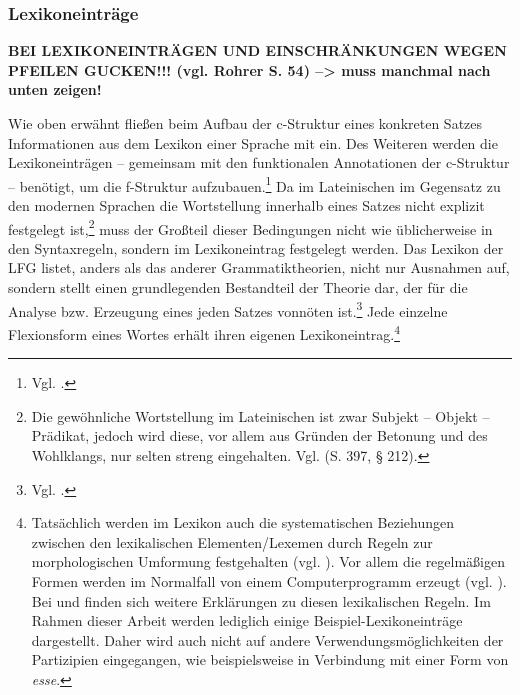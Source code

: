 \documentclass[12pt,a4paper]{article}
\begin{document}
\subsubsection{Lexikoneinträge}

\textbf{BEI LEXIKONEINTRÄGEN UND EINSCHRÄNKUNGEN WEGEN PFEILEN GUCKEN!!! (vgl. Rohrer S. 54) --> muss manchmal nach unten zeigen!}

Wie oben erwähnt fließen beim Aufbau der c-Struktur eines konkreten Satzes Informationen aus dem Lexikon einer Sprache mit ein. Des Weiteren werden die Lexikoneinträgen -- gemeinsam mit den funktionalen Annotationen der c-Struktur  -- benötigt, um die f-Struktur aufzubauen.\footnote{Vgl. \cite[63]{Skript}.} Da im Lateinischen im Gegensatz zu den modernen Sprachen die Wortstellung innerhalb eines Satzes nicht explizit festgelegt ist,\footnote{Die gewöhnliche Wortstellung im Lateinischen ist zwar Subjekt – Objekt – Prädikat, jedoch wird diese, vor allem aus Gründen der Betonung und des Wohlklangs, nur selten streng eingehalten. Vgl. \cite[397 §212]{LHS} (S. 397, § 212).} muss der Großteil dieser Bedingungen nicht wie üblicherweise in den Syntaxregeln, sondern im Lexikoneintrag festgelegt werden. Das Lexikon der LFG listet, anders als das anderer Grammatiktheorien, nicht nur Ausnahmen auf, sondern stellt einen grundlegenden Bestandteil der Theorie dar, der für die Analyse bzw. Erzeugung eines jeden Satzes vonnöten ist.\footnote{Vgl. \cite[3]{Dal}.} Jede einzelne Flexionsform eines Wortes erhält ihren eigenen Lexikoneintrag.\footnote{Tatsächlich werden im Lexikon auch die systematischen Beziehungen zwischen den lexikalischen Elementen/Lexemen durch Regeln zur morphologischen Umformung festgehalten (vgl. \cite[3]{Dal}). Vor allem die regelmäßigen Formen werden im Normalfall von einem Computerprogramm erzeugt (vgl. \cite[15]{Rohrer}). Bei \cite[63-76]{Skript} und \cite[20-21]{Rohrer} finden sich weitere Erklärungen zu diesen lexikalischen Regeln. Im Rahmen dieser Arbeit werden lediglich einige Beispiel-Lexikoneinträge dargestellt. Daher wird auch nicht auf andere Verwendungsmöglichkeiten der Partizipien eingegangen, wie beispielsweise in Verbindung mit einer Form von \textit{esse}.}




\end{document}
